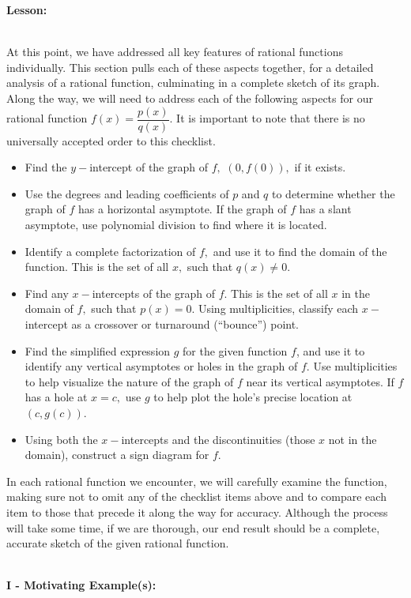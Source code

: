 \documentclass[12pt]{article}
\theoremstyle{definition}
\begin{document}
{\bf Lesson:}\\
\ \par
At this point, we have addressed all key features of rational functions individually.  This section pulls each of these aspects together, for a detailed analysis of a rational function, culminating in a complete sketch of its graph.  Along the way, we will need to address each of the following aspects for our rational function $f(x)=\dfrac{p(x)}{q(x)}$.  It is important to note that there is no universally accepted order to this checklist.
\begin{itemize}
	\item Find the $y-$intercept of the graph of $f,$ $(0,f(0)),$ if it exists.
	\item Use the degrees and leading coefficients of $p$ and $q$ to determine whether the graph of $f$ has a horizontal asymptote.  If the graph of $f$ has a slant asymptote, use polynomial division to find where it is located.
	\item Identify a complete factorization of $f,$ and use it to find the domain of the function.  This is the set of all $x,$ such that $q(x)\neq 0$.
	\item Find any $x-$intercepts of the graph of $f$.  This is the set of all $x$ in the domain of $f,$ such that $p(x)=0$.  Using multiplicities, classify each $x-$intercept as a crossover or turnaround (``bounce'') point.
	\item Find the simplified expression $g$ for the given function $f$, and use it to identify any vertical asymptotes or holes in the graph of $f$.  Use multiplicities to help visualize the nature of the graph of $f$ near its vertical asymptotes.  If $f$ has a hole at $x=c,$ use $g$ to help plot the hole's precise location at $(c,g(c))$. 
	\item Using both the $x-$intercepts and the discontinuities (those $x$ not in the domain), construct a sign diagram for $f$.
\end{itemize}
In each rational function we encounter, we will carefully examine the function, making sure not to omit any of the checklist items above and to compare each item to those that precede it along the way for accuracy.  Although the process will take some time, if we are thorough, our end result should be a complete, accurate sketch of the given rational function.\\
\ \par
{\bf I - Motivating Example(s):}\\
\ \par
\end{document}
